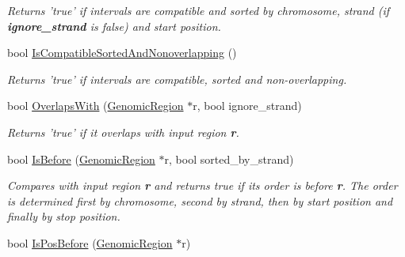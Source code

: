 \begin{CompactItemize}
\begin{CompactList}\small\item\em Returns 'true' if intervals are compatible and sorted by chromosome, strand (if {\bf ignore\_\-strand} is false) and start position. \item\end{CompactList}\item 
\hypertarget{classGenomicRegion_fb2db74a3cd85a84533375483e12b96c}{
bool \hyperlink{classGenomicRegion_fb2db74a3cd85a84533375483e12b96c}{IsCompatibleSortedAndNonoverlapping} ()}
\label{classGenomicRegion_fb2db74a3cd85a84533375483e12b96c}

\begin{CompactList}\small\item\em Returns 'true' if intervals are compatible, sorted and non-overlapping. \item\end{CompactList}\item 
\hypertarget{classGenomicRegion_9e3617a0046fe5fa8fce9f9cce8c3c37}{
bool \hyperlink{classGenomicRegion_9e3617a0046fe5fa8fce9f9cce8c3c37}{OverlapsWith} (\hyperlink{classGenomicRegion}{GenomicRegion} $\ast$r, bool ignore\_\-strand)}
\label{classGenomicRegion_9e3617a0046fe5fa8fce9f9cce8c3c37}

\begin{CompactList}\small\item\em Returns 'true' if it overlaps with input region {\bf r}. \item\end{CompactList}\item 
\hypertarget{classGenomicRegion_25634257eb7a2ed379548b17a83414fb}{
bool \hyperlink{classGenomicRegion_25634257eb7a2ed379548b17a83414fb}{IsBefore} (\hyperlink{classGenomicRegion}{GenomicRegion} $\ast$r, bool sorted\_\-by\_\-strand)}
\label{classGenomicRegion_25634257eb7a2ed379548b17a83414fb}

\begin{CompactList}\small\item\em Compares with input region {\bf r} and returns true if its order is before {\bf r}. The order is determined first by chromosome, second by strand, then by start position and finally by stop position. \item\end{CompactList}\item 
\hypertarget{classGenomicRegion_2065cf74a82c2340b1e49e7f7ec0fdd4}{
bool \hyperlink{classGenomicRegion_2065cf74a82c2340b1e49e7f7ec0fdd4}{IsPosBefore} (\hyperlink{classGenomicRegion}{GenomicRegion} $\ast$r)}
\label{classGenomicRegion_2065cf74a82c2340b1e49e7f7ec0fdd4}


\end{CompactItemize}
